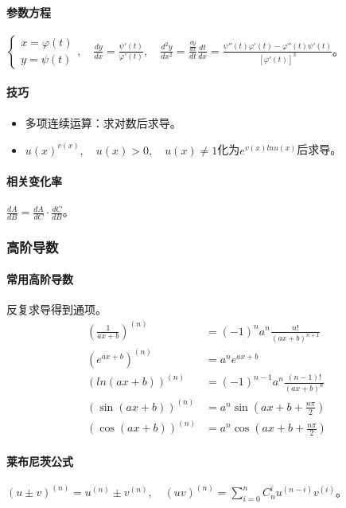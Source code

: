 \documentclass[
12pt, %
a4paper, 
oneside, %
]{scrartcl}
\begin{document}
\paragraph{参数方程}
$ \begin{cases} x = \varphi(t) \\ y = \psi(t) \end{cases}, \quad \frac{d y}{d x} = \frac{\psi'(t)}{\varphi'(t)}, \quad \frac{d^2 y}{d x^2} = \frac{\frac{d y}{d x}}{d t} \frac{d t}{d x} = \frac{\psi''(t) \varphi'(t) - \varphi''(t) \psi'(t)}{[\varphi'(t)]^3} $。
\paragraph{技巧}
\begin{itemize}
\item 多项连续运算：求对数后求导。
\item $ u(x)^{v(x)}, \quad u(x) > 0, \quad u(x) \neq 1 $化为$ e^{v(x) ln u(x)} $后求导。
\end{itemize}
\paragraph{相关变化率}
$ \frac{d A}{d B} = \frac{d A}{d C} \cdot \frac{d C}{d B} $。
\subsubsection[高阶导数]{高阶导数}
\paragraph{常用高阶导数}
反复求导得到通项。
\begin{align*}
(\frac{1}{ax + b})^{(n)} &= (-1)^n a^n \frac{n!}{(ax + b)^{n + 1}} \\
(e^{ax + b})^{(n)} &= a^n e^{ax + b} \\
(ln(ax + b))^{(n)} &= (-1)^{n - 1} a^n \frac{(n - 1)!}{(ax + b)^n} \\
(\sin(ax + b))^{(n)} &= a^n \sin(ax + b + \frac{n\pi}{2}) \\
(\cos(ax + b))^{(n)} &= a^n \cos(ax + b + \frac{n\pi}{2})
\end{align*}
\paragraph{莱布尼茨公式}
$ (u \pm v)^{(n)} = u^{(n)} \pm v^{(n)}, \quad (uv)^{(n)} = \sum_{i = 0}^n C_n^i u^{(n - i)}v^{(i)} $。
\end{document}
